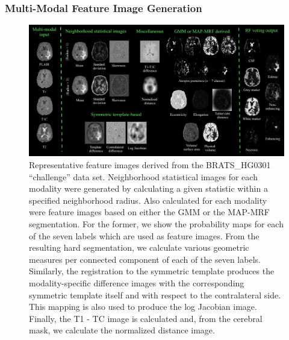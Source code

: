 \documentclass[final,5p,times,twocolumn]{elsarticle}
\begin{document}
\subsubsection{Multi-Modal Feature Image Generation}

\begin{figure}
  \centering
  \includegraphics[width=180mm]{Figures/featureImages.pdf}
  \caption{Representative feature images derived from the BRATS\_HG0301 ``challenge'' data set.
           Neighborhood statistical images for each modality were generated by calculating a 
           given statistic within
           a specified neighborhood radius.  Also calculated for each modality were feature
           images based on either the GMM or the MAP-MRF segmentation.  For the former, we
           show the probability maps for each of the seven labels which are used as feature
           images.  From the resulting hard segmentation, we calculate various geometric 
           measures per connected component of each of the seven labels.  Similarly, the 
           registration to the symmetric template produces the modality-specific difference images with the
           corresponding symmetric template itself and with respect to the contralateral side.   
           This mapping is also used to produce the log Jacobian image.  Finally, the T1 - TC image
           is calculated and, from the
           cerebral mask, we calculate the normalized distance image.  
           }
\end{figure}
\end{document}
